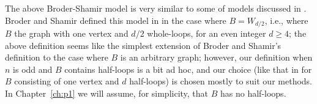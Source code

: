 \documentclass{memo-l}
\theoremstyle{plain}
\theoremstyle{definition}
\numberwithin{section}{chapter}
\numberwithin{equation}{chapter}
\DeclareMathOperator{\Prob}{Prob}
\theoremstyle{plain}
\theoremstyle{definition}
\newcommand\EE{\mathbb{E}}
\newcommand\cC{\mathcal{C}}
\newcommand\cE{\mathcal{E}}
\begin{document}

The above Broder-Shamir model is very similar to some of models discussed
in \cite{friedman_relative,friedman_alon}.
Broder and Shamir defined this model in \cite{broder} in the case where
$B=W_{d/2}$, i.e., where $B$ the graph with one vertex and $d/2$
whole-loops, for an even integer $d\ge 4$; the above definition seems
like the simplest extension of Broder and Shamir's definition to the
case where $B$ is an arbitrary graph; however, our definition when $n$ is
odd and $B$ contains half-loops is a bit ad hoc, and our choice
(like that in \cite{friedman_alon} for $B$ consisting of one vertex
and $d$ half-loops) is chosen mostly to suit our methods.
In Chapter~\ref{ch:p1} we
will assume, for simplicity, that $B$ has no half-loops.
\end{document}
